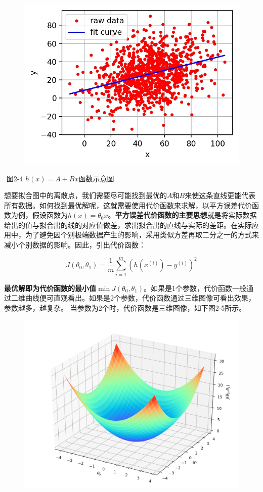 \begin{figure}
\centering
\includegraphics{./img/ch2/2.16/1.jpg}
\caption{}
\end{figure}

​ 图2-4 $h(x) = A + Bx$函数示意图

​
想要拟合图中的离散点，我们需要尽可能找到最优的$A$和$B$来使这条直线更能代表所有数据。如何找到最优解呢，这就需要使用代价函数来求解，以平方误差代价函数为例，假设函数为$h(x)=\theta_0x$。
​
\textbf{平方误差代价函数的主要思想}就是将实际数据给出的值与拟合出的线的对应值做差，求出拟合出的直线与实际的差距。在实际应用中，为了避免因个别极端数据产生的影响，采用类似方差再取二分之一的方式来减小个别数据的影响。因此，引出代价函数：

\[
J(\theta_0, \theta_1) = \frac{1}{m}\sum_{i=1}^m(h(x^{(i)})-y^{(i)})^2
\]

​
\textbf{最优解即为代价函数的最小值}$\min J(\theta_0, \theta_1)$。如果是1个参数，代价函数一般通过二维曲线便可直观看出。如果是2个参数，代价函数通过三维图像可看出效果，参数越多，越复杂。
当参数为2个时，代价函数是三维图像，如下图2-5所示。

\begin{figure}
\centering
\includegraphics{./img/ch2/2.16/2.jpg}
\caption{}
\end{figure}


